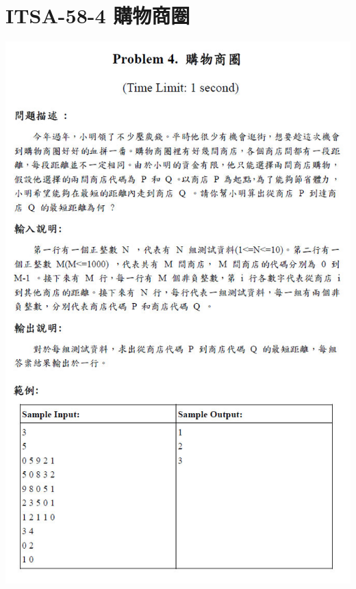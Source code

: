 \section{ITSA-58-4 購物商圈}
\centerline{\includegraphics[height=.95\textheight]{../solutions/fig/58ITSA4}}
